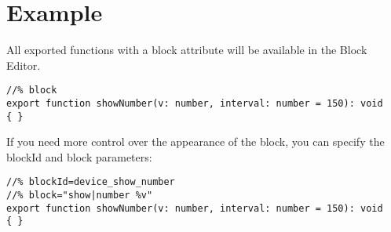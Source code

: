 \documentclass[sigplan,10pt]{acmart}
\begin{document}
% 






\maketitle



\section{Example}

All exported functions with a block attribute will be available in the Block Editor.

\begin{lstlisting}
//% block
export function showNumber(v: number, interval: number = 150): void
{ }
\end{lstlisting}
If you need more control over the appearance of the block, you can specify the 
blockId and block parameters:
\begin{lstlisting}
//% blockId=device_show_number
//% block="show|number %v"
export function showNumber(v: number, interval: number = 150): void
{ }
\end{lstlisting}

\end{document}
